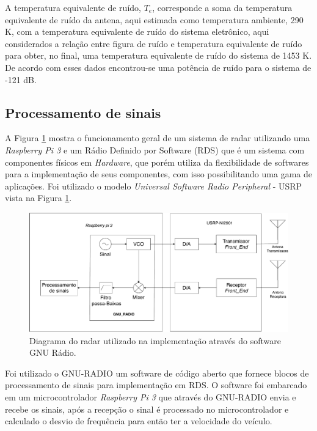A temperatura equivalente de ruído, $T_e$, corresponde a soma da temperatura equivalente de ruído da antena, aqui estimada como temperatura ambiente, 290 K, com a temperatura equivalente de ruído do sistema eletrônico, aqui considerados a relação entre figura de ruído e temperatura equivalente de ruído para obter, no final, uma temperatura equivalente de ruído do sistema de 1453 K. De acordo com esses dados encontrou-se uma potência de ruído para o sistema de -121 dB.

\subsection{Processamento de sinais}

A Figura \ref{processos_geral_radar} mostra o funcionamento geral de um sistema de radar utilizando uma \emph{Raspberry Pi 3} e um Rádio Definido por Software (RDS) que é um sistema com componentes físicos em  \emph{Hardware}, que porém utiliza da flexibilidade de softwares para a implementação  de seus componentes, com isso possibilitando uma gama de aplicações. Foi utilizado o  modelo \emph{Universal Software Radio Peripheral} - USRP vista na Figura \ref{processos_geral_radar}.



\begin{figure}[H]
    \centering
    \includegraphics[scale=0.35]{figuras/diagrama_radar2.pdf}
    \caption{Diagrama do radar utilizado na implementação através do software GNU Rádio.}
    \label{processos_geral_radar}
\end{figure}

Foi utilizado o GNU-RADIO um software de código aberto que fornece blocos de processamento de sinais para implementação em RDS. O software foi embarcado em um microcontrolador \emph{Raspberry Pi 3} que através do GNU-RADIO envia e recebe os sinais, após a recepção o sinal é processado no microcontrolador e calculado o desvio de frequência para então ter a velocidade do veículo. 


